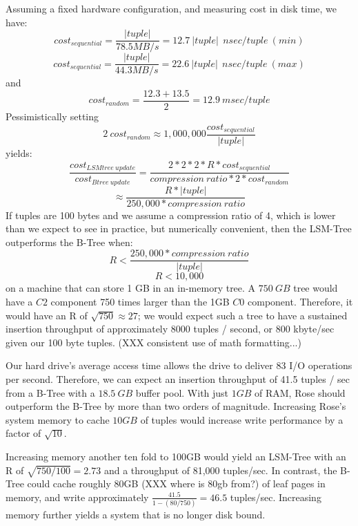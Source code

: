 \documentclass{vldb}
\newcommand{\rows}{Rose\xspace}
\newcommand{\rowss}{Rose's\xspace}
\begin{document}
Assuming a fixed hardware configuration, and measuring cost in disk
time, we have:
\[
   cost_{sequential}=\frac{|tuple|}{78.5MB/s}=12.7~|tuple|~~nsec/tuple~(min)
\]
\[
   cost_{sequential}=\frac{|tuple|}{44.3MB/s}=22.6~|tuple|~~nsec/tuple~(max)
\]
and
\[
   cost_{random}=\frac{12.3+13.5}{2} = 12.9~msec/tuple
\]
Pessimistically setting
\[
2~cost_{random}\approx1,000,000\frac{cost_{sequential}}{|tuple|}
\] yields: \[
    \frac{cost_{LSMtree~update}}{cost_{Btree~update}}=\frac{2*2*2*R*cost_{sequential}}{compression~ratio*2*cost_{random}}
\]
\[
   \approx\frac{R*|tuple|}{250,000*compression~ratio}
\]
If tuples are 100 bytes and we assume a compression ratio of 4, which is lower
than we expect to see in practice, but numerically convenient, then the
LSM-Tree outperforms the B-Tree when:
\[
    R < \frac{250,000*compression~ratio}{|tuple|}
\]
\[
    R < 10,000
\]
on a machine that can store 1 GB in an in-memory tree.
  A $750~GB$ tree would
have a $C2$ component 750 times larger than the 1GB $C0$ component.
Therefore, it would have an R of $\sqrt{750}\approx27$; we would
expect such a tree to have a sustained insertion throughput of
approximately 8000 tuples / second, or 800 kbyte/sec
given our 100 byte tuples. (XXX consistent use of math formatting...)

Our hard drive's average access time allows the drive to deliver 83 I/O operations per
second.  Therefore, we can expect an insertion throughput of 41.5
tuples / sec from a B-Tree with a $18.5~GB$ buffer pool.  With just $1GB$ of RAM, \rows should outperform the
B-Tree by more than two orders of magnitude.  Increasing \rowss system
memory to cache $10 GB$ of tuples would increase write performance by a
factor of $\sqrt{10}$.


Increasing memory another ten fold to 100GB would yield an LSM-Tree
with an R of $\sqrt{750/100} = 2.73$ and a throughput of 81,000
tuples/sec.  In contrast, the B-Tree could cache roughly 80GB (XXX where is 80gb from?) of leaf pages
in memory, and write approximately $\frac{41.5}{1-(80/750)} = 46.5$
tuples/sec.  Increasing memory further yields a system that
is no longer disk bound.
\end{document}
